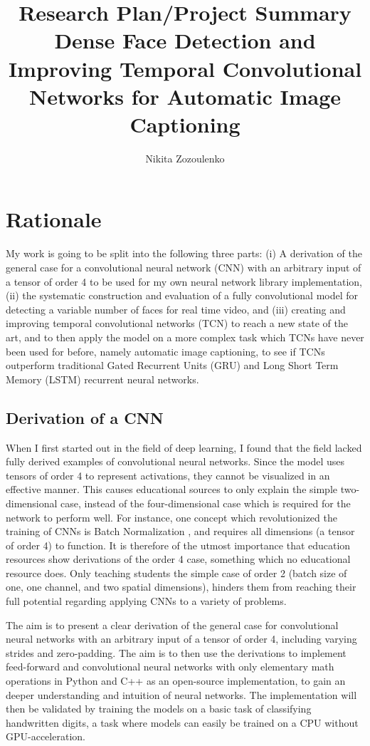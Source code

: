 \documentclass[a4paper, twoside]{article}
\title{\huge{\textbf{Research Plan/Project Summary}\\}
\Large{Dense Face Detection and Improving Temporal Convolutional Networks for Automatic Image Captioning}}
\author{Nikita Zozoulenko}
\begin{document}
\maketitle

\newpage
\section{Rationale}
My work is going to be split into the following three parts: (i) A derivation of the general case for a convolutional neural network (CNN) with an arbitrary input of a tensor of order 4 to be used for my own neural network library implementation, (ii) the systematic construction and evaluation of a fully convolutional model for detecting a variable number of faces for real time video, and (iii) creating and improving temporal convolutional networks (TCN) to reach a new state of the art, and to then apply the model on a more complex task which TCNs have never been used for before, namely automatic image captioning, to see if TCNs outperform traditional Gated Recurrent Units (GRU) and Long Short Term Memory (LSTM) recurrent neural networks.

\subsection{Derivation of a CNN}
When I first started out in the field of deep learning, I found that the field lacked fully derived examples of convolutional neural networks. Since the model uses tensors of order 4 to represent activations, they cannot be visualized in an effective manner. This causes educational sources to only explain the simple two-dimensional case, instead of the four-dimensional case which is required for the network to perform well. For instance, one concept which revolutionized the training of CNNs is Batch Normalization \cite{cs231n}\cite{batchnorm}, and requires all dimensions (a tensor of order 4) to function. It is therefore of the utmost importance that education resources show derivations of the order 4 case, something which no educational resource does. Only teaching students the simple case of order 2 (batch size of one, one channel, and two spatial dimensions), hinders them from reaching their full potential regarding applying CNNs to a variety of problems.

The aim is to present a clear derivation of the general case for convolutional neural networks with an arbitrary input of a tensor of order 4, including varying strides and zero-padding. The aim is to then use the derivations to implement feed-forward and convolutional neural networks with only elementary math operations in Python and C++ as an open-source implementation, to gain an deeper understanding and intuition of neural networks. The implementation will then be validated by training the models on a basic task of classifying handwritten digits, a task where models can easily be trained on a CPU without GPU-acceleration.
\end{document}
